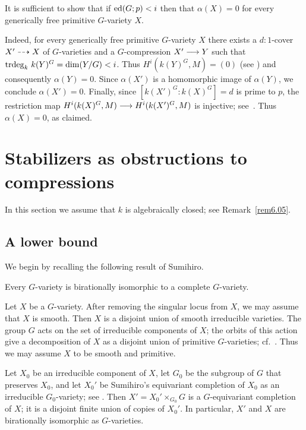 \begin{pf} It is sufficient to show that if $\operatorname{ed}(G; p) < i$ then
that $\alpha(X) =0$ for every generically free primitive $G$-variety $X$. 

Indeed, for every generically free primitive $G$-variety $X$ 
there exists a $d:1$-cover $X' \dasharrow X$ of $G$-varieties and 
a $G$-compression $X' \longrightarrow Y$ such that $\operatorname{trdeg}_k \, k(Y)^G = \dim(Y/G) < i$. 
Thus $H^i(k(Y)^G, M) = (0)$ (see \cite[II.4.2]{serregc})
and consequently $\alpha(Y) = 0$. Since $\alpha(X')$ is a homomorphic
image of $\alpha(Y)$, we conclude $\alpha(X') = 0$. Finally, since
$[k(X')^G : k(X)^G] = d$ is prime to $p$, the restriction map
$H^i(k(X)^G, M) \longrightarrow H^i(k(X')^G, M)$ is injective; 
see~\cite[I.2.4]{serregc}.  Thus $\alpha(X) = 0$, as claimed.
\end{pf}

\section{Stabilizers as obstructions to compressions}
\label{sect7}

In this section we assume that $k$ is algebraically closed; see 
Remark~\ref{rem6.05}. 

\subsection*{A lower bound}

We begin by recalling the following result of Sumihiro.

\begin{prop} \label{prop.s-k}
Every $G$-variety is birationally isomorphic to a complete $G$-variety.
\end{prop}

\begin{pf} Let $X$ be a $G$-variety. 
After removing the singular locus from $X$, we may assume that
$X$ is smooth.  Then $X$ is a disjoint union of smooth irreducible 
varieties.  The group $G$ acts on the set of
irreducible components of $X$; the orbits of this
action give a decomposition of $X$ as 
a disjoint union of primitive $G$-varieties; cf.~\cite[Lemma~2.2(a)]{r2}.
Thus we may assume $X$ to be smooth and primitive. 

Let $X_0$ be an irreducible component of $X$, let $G_0$
be the subgroup of $G$ that preserves $X_0$, and let $X_0'$ be Sumihiro's
equivariant completion of $X_0$ as an irreducible $G_0$-variety; see
\cite[Theorem 3]{sumihiro}.
Then $X'=X_0'\times_{G_0}G$ is a $G$-equivariant completion of $X$;
it is a disjoint finite union of copies of $X_0'$.
In particular, $X'$ and $X$ are birationally isomorphic as $G$-varieties.
\end{pf}

